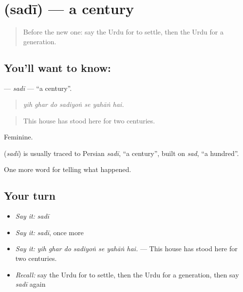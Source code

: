 \section[\texorpdfstring{\ur{صدی} (sadī)}{صدی (sadī)}]{ (sadī) — a century}

\label{lesson:UR-C315-sadi}



\begin{quote}
Before the new one: say the Urdu for to settle, then the Urdu for a generation.
\end{quote}

\subsection*{You'll want to know: }
\textbf{} — \emph{sadī} — \textquotedblleft{}a century\textquotedblright{}.

\begin{quote}
      
\end{quote}

\begin{quote}
\emph{yih ghar do sadiyoṅ se yahāṅ hai.}
\end{quote}

\begin{quote}
This house has stood here for two centuries.
\end{quote}

Feminine.

\begin{cousinweb}
\textbf{} (\emph{sadī}) is usually traced to Persian \emph{sadī}, \textquotedblleft{}a century\textquotedblright{}, built on \emph{sad}, \textquotedblleft{}a hundred\textquotedblright{}.
\end{cousinweb}

\begin{grammarlens}[title={What you've built}]
One more word for telling what happened.
\end{grammarlens}

\subsection*{Your turn}
\begin{itemize}
\raggedright
  \item \emph{Say it:} \emph{sadī}
  \item \emph{Say it:} \emph{sadī}, once more
  \item \emph{Say it:} \emph{yih ghar do sadiyoṅ se yahāṅ hai.} — This house has stood here for two centuries.
  \item \emph{Recall:} say the Urdu for to settle, then the Urdu for a generation, then say \emph{sadī} again
\end{itemize}

